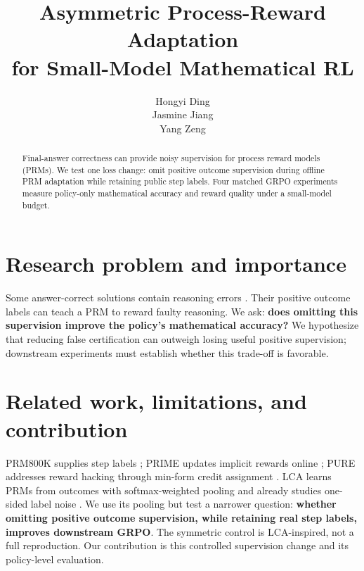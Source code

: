 \documentclass{article}
\title{Asymmetric Process-Reward Adaptation\\for Small-Model Mathematical RL}
\author{
Hongyi Ding \\
\And
Jasmine Jiang \\
\And
Yang Zeng \\
}
\begin{document}
\maketitle
\begin{abstract}
Final-answer correctness can provide noisy supervision for process reward models (PRMs). We test one loss change: omit positive outcome supervision during offline PRM adaptation while retaining public step labels. Four matched GRPO experiments measure policy-only mathematical accuracy and reward quality under a small-model budget.
\end{abstract}

\section{Research problem and importance}
Some answer-correct solutions contain reasoning errors \citep{zheng2025}. Their positive outcome labels can teach a PRM to reward faulty reasoning. We ask: \textbf{does omitting this supervision improve the policy's mathematical accuracy?} We hypothesize that reducing false certification can outweigh losing useful positive supervision; downstream experiments must establish whether this trade-off is favorable.

\section{Related work, limitations, and contribution}
PRM800K supplies step labels \citep{lightman2023}; PRIME updates implicit rewards online \citep{cui2025}; PURE addresses reward hacking through min-form credit assignment \citep{cheng2025}. LCA learns PRMs from outcomes with softmax-weighted pooling and already studies one-sided label noise \citep{jia2026}. We use its pooling but test a narrower question: \textbf{whether omitting positive outcome supervision, while retaining real step labels, improves downstream GRPO}. The symmetric control is LCA-inspired, not a full reproduction. Our contribution is this controlled supervision change and its policy-level evaluation.
\end{document}
